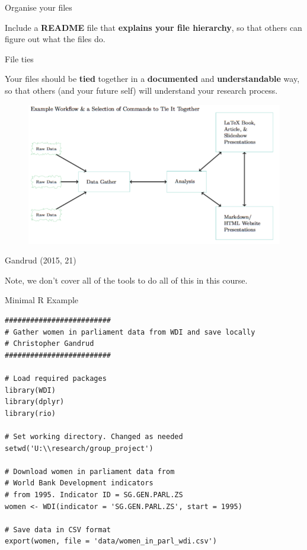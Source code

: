 \documentclass[10pt]{beamer}
\begin{document}
\begin{frame}{Organise your files}

    Include a \textbf{README} file that \textbf{explains your file hierarchy}, so that others can figure out what the files do.

\end{frame}

\begin{frame}{File ties}

    Your files should be \textbf{tied} together in a \textbf{documented} and \textbf{understandable} way, so that others (and your future self) will understand your research process.

\end{frame}

\begin{frame}

    \begin{figure}
        \includegraphics[scale=0.35]{img/workflow.png}
    \end{figure}
{\tiny{Gandrud (2015, 21)}}


Note, we don't cover all of the tools to do all of this in this course.
\end{frame}


\begin{frame}[fragile]{Minimal R Example}

\begin{lstlisting}
#########################
# Gather women in parliament data from WDI and save locally
# Christopher Gandrud
#########################

# Load required packages
library(WDI)
library(dplyr)
library(rio)

# Set working directory. Changed as needed
setwd('U:\\research/group_project')

# Download women in parliament data from
# World Bank Development indicators
# from 1995. Indicator ID = SG.GEN.PARL.ZS
women <- WDI(indicator = 'SG.GEN.PARL.ZS', start = 1995)

# Save data in CSV format
export(women, file = 'data/women_in_parl_wdi.csv')
\end{lstlisting}

\end{frame}
\end{document}
